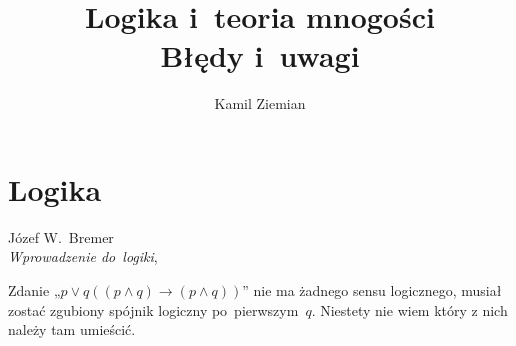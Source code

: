 \documentclass[a4paper,11pt]{article}
\title{Logika i~teoria mnogości \\
  {\Large Błędy i~uwagi}}
\author{Kamil Ziemian}
\numberwithin{equation}{section}
\begin{document}





\maketitle  %





\section{Logika}




Józef W.~Bremer \\
\textit{Wprowadzenie do~logiki},
\cite{Bremer-Wprowadzenie-do-logiki-Wyd-2004}






\noindent
{} Zdanie „$p \vee q ( ( p \land q ) \to ( p \land q ) )$” nie ma
żadnego sensu logicznego, musiał zostać zgubiony spójnik logiczny
po~pierwszym~$q$. Niestety nie wiem który z nich należy tam umieścić.





\end{document}

